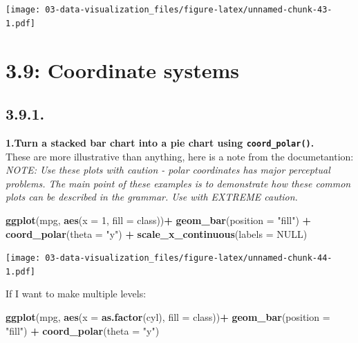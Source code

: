 \documentclass[]{book}
\newenvironment{Shaded}{\begin{snugshade}}{\end{snugshade}}
\newcommand{\DataTypeTok}[1]{\textcolor[rgb]{0.13,0.29,0.53}{#1}}
\newcommand{\DecValTok}[1]{\textcolor[rgb]{0.00,0.00,0.81}{#1}}
\newcommand{\KeywordTok}[1]{\textcolor[rgb]{0.13,0.29,0.53}{\textbf{#1}}}
\newcommand{\NormalTok}[1]{#1}
\newcommand{\OperatorTok}[1]{\textcolor[rgb]{0.81,0.36,0.00}{\textbf{#1}}}
\newcommand{\OtherTok}[1]{\textcolor[rgb]{0.56,0.35,0.01}{#1}}
\newcommand{\StringTok}[1]{\textcolor[rgb]{0.31,0.60,0.02}{#1}}
\theoremstyle{definition}
\theoremstyle{definition}
\theoremstyle{definition}
\theoremstyle{remark}
\begin{document}
\texttt{[image: 03-data-visualization\_files/figure-latex/unnamed-chunk-43-1.pdf]}

\hypertarget{coordinate-systems}{%
\section{3.9: Coordinate systems}\label{coordinate-systems}}

\hypertarget{section-6}{%
\subsection{3.9.1.}\label{section-6}}

\textbf{1.Turn a stacked bar chart into a pie chart using
\texttt{coord\_polar()}.}\\
These are more illustrative than anything, here is a note from the
documetantion:\\
\emph{NOTE: Use these plots with caution - polar coordinates has major
perceptual problems. The main point of these examples is to demonstrate
how these common plots can be described in the grammar. Use with EXTREME
caution.}

\begin{Shaded}
\begin{Highlighting}[]
\KeywordTok{ggplot}\NormalTok{(mpg, }\KeywordTok{aes}\NormalTok{(}\DataTypeTok{x =} \DecValTok{1}\NormalTok{, }\DataTypeTok{fill =}\NormalTok{ class))}\OperatorTok{+}
\StringTok{  }\KeywordTok{geom_bar}\NormalTok{(}\DataTypeTok{position =} \StringTok{"fill"}\NormalTok{) }\OperatorTok{+}
\StringTok{  }\KeywordTok{coord_polar}\NormalTok{(}\DataTypeTok{theta =} \StringTok{"y"}\NormalTok{) }\OperatorTok{+}\StringTok{ }
\StringTok{  }\KeywordTok{scale_x_continuous}\NormalTok{(}\DataTypeTok{labels =} \OtherTok{NULL}\NormalTok{)}
\end{Highlighting}
\end{Shaded}

\texttt{[image: 03-data-visualization\_files/figure-latex/unnamed-chunk-44-1.pdf]}

If I want to make multiple levels:

\begin{Shaded}
\begin{Highlighting}[]
\KeywordTok{ggplot}\NormalTok{(mpg, }\KeywordTok{aes}\NormalTok{(}\DataTypeTok{x =} \KeywordTok{as.factor}\NormalTok{(cyl), }\DataTypeTok{fill =}\NormalTok{ class))}\OperatorTok{+}
\StringTok{  }\KeywordTok{geom_bar}\NormalTok{(}\DataTypeTok{position =} \StringTok{"fill"}\NormalTok{) }\OperatorTok{+}
\StringTok{  }\KeywordTok{coord_polar}\NormalTok{(}\DataTypeTok{theta =} \StringTok{"y"}\NormalTok{)}
\end{Highlighting}
\end{Shaded}
\end{document}
